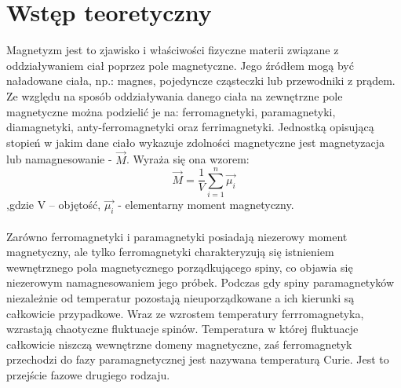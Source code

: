 \documentclass[a4paper,10pt]{article}
\begin{document}
\section{Wstęp teoretyczny}
Magnetyzm jest to zjawisko i właściwości fizyczne materii związane z oddziaływaniem ciał poprzez pole magnetyczne. Jego źródłem mogą być naładowane ciała, np.:
magnes, pojedyncze cząsteczki lub przewodniki z prądem. Ze względu na sposób oddziaływania danego ciała na zewnętrzne pole magnetyczne można podzielić je na:
ferromagnetyki, paramagnetyki, diamagnetyki, anty-ferromagnetyki oraz ferrimagnetyki. Jednostką opisującą stopień w jakim dane ciało wykazuje zdolności magnetyczne
jest magnetyzacja lub namagnesowanie - $\vec{M}$. Wyraża się ona wzorem:
\begin{equation}
\vec{M} =\frac{1}{V} \sum_{i=1}^n \vec{\mu_i}
\end{equation}
,gdzie V – objętość, $\vec{\mu_i}$ - elementarny moment magnetyczny.
\\%
\\Zarówno ferromagnetyki i paramagnetyki posiadają niezerowy moment magnetyczny, ale  tylko ferromagnetyki charakteryzują się istnieniem wewnętrznego pola
magnetycznego porządkującego spiny, co objawia się niezerowym namagnesowaniem jego próbek. Podczas gdy spiny paramagnetyków niezależnie od temperatur pozostają
nieuporządkowane a ich kierunki są całkowicie przypadkowe. Wraz ze wzrostem temperatury ferrromagnetyka, wzrastają chaotyczne fluktuacje spinów. Temperatura w której fluktuacje całkowicie niszczą wewnętrzne domeny magnetyczne, zaś ferromagnetyk przechodzi do fazy paramagnetycznej jest nazywana temperaturą Curie. Jest to przejście fazowe drugiego rodzaju.
\end{document}
